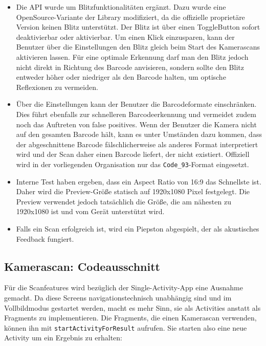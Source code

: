 \begin{itemize}
\tightlist
\item
  Die API wurde um Blitzfunktionalitäten ergänzt. Dazu wurde eine
  OpenSource-Variante der Library modifiziert, da die offizielle
  proprietäre Version keinen Blitz unterstützt. Der Blitz ist über einen
  ToggleButton sofort deaktivierbar oder aktivierbar. Um einen Klick
  einzusparen, kann der Benutzer über die Einstellungen den Blitz gleich
  beim Start des Kamerascans aktivieren lassen. Für eine optimale
  Erkennung darf man den Blitz jedoch nicht direkt in Richtung des
  Barcode anvisieren, sondern sollte den Blitz entweder höher oder
  niedriger als den Barcode halten, um optische Reflexionen zu
  vermeiden.
\item
  Über die Einstellungen kann der Benutzer die Barcodeformate
  einschränken. Dies führt ebenfalls zur schnelleren Barcodeerkennung
  und vermeidet zudem noch das Auftreten von false positives. Wenn der
  Benutzer die Kamera nicht auf den gesamten Barcode hält, kann es unter
  Umständen dazu kommen, dass der abgeschnittene Barcode
  fälschlicherweise als anderes Format interpretiert wird und der Scan
  daher einen Barcode liefert, der nicht existiert. Offiziell wird in
  der vorliegenden Organisation nur das \texttt{Code\_93}-Format
  eingesetzt.
\item
  Interne Test haben ergeben, dass ein Aspect Ratio von 16:9 das
  Schnellste ist. Daher wird die Preview-Größe statisch auf 1920x1080
  Pixel festgelegt. Die Preview verwendet jedoch tatsächlich die Größe,
  die am nähesten zu 1920x1080 ist und vom Gerät unterstützt wird.
\item
  Falls ein Scan erfolgreich ist, wird ein Piepston abgespielt, der als
  akustisches Feedback fungiert.
\end{itemize}

\hypertarget{kamerascan-codeausschnitt}{%
\subsection{Kamerascan:
Codeausschnitt}\label{kamerascan-codeausschnitt}}

Für die Scanfeatures wird bezüglich der Single-Activity-App eine
Ausnahme gemacht. Da diese Screens navigationstechnisch unabhängig sind
und im Vollbildmodus gestartet werden, macht es mehr Sinn, sie als
Activities anstatt als Fragments zu implementieren. Die Fragments, die
einen Kamerascan verwenden, können ihn mit
\texttt{startActivityForResult} aufrufen. Sie starten also eine neue
Activity um ein Ergebnis zu erhalten:

